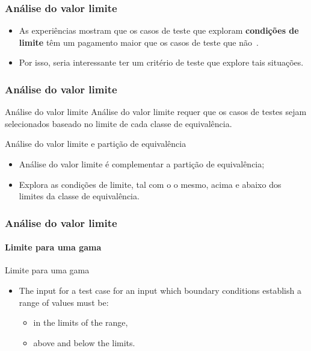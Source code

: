\begin{frame}[hasprev=false, hasnext=true, parent={concept:functional-testing}]
\frametitle{Análise do valor limite}

\begin{block:fact}{}
\begin{itemize}
	\item As experiências mostram que os casos de teste que exploram \textbf{condições
	de limite} têm um pagamento maior que os casos de teste que não~\cite[p. 59]{myers:2004}.

	\item Por isso, seria interessante ter um critério de teste que
	explore tais situações.
\end{itemize}
\end{block:fact}
\end{frame}


\begin{frame}[hasprev=true, hasnext=true]
\frametitle{Análise do valor limite}
\label{concept:boundary-value-analysis}

\begin{block:concept}{Análise do valor limite}
Análise do valor limite requer que os casos de testes sejam selecionados baseado no
limite de cada classe de equivalência.
\end{block:concept}

\begin{block:fact}{Análise do valor limite e partição de equivalência}
\begin{itemize}
	\item Análise do valor limite é complementar a partição de equivalência;

	\item Explora as condições de limite, tal com o o mesmo, acima e abaixo
	dos limites da classe de equivalência.
\end{itemize}
\end{block:fact}
\end{frame}


\begin{frame}
\frametitle{Análise do valor limite}
\framesubtitle{Limite para uma gama}

\begin{block:fact}{Limite para uma gama}
\begin{itemize}
	\item The input for a test case for an input which boundary conditions
	establish a range of values must be:
	\begin{itemize}
		\item in the limits of the range,
		\item above and below the limits.
	\end{itemize}
\end{itemize}
\end{block:fact}
\end{frame}


